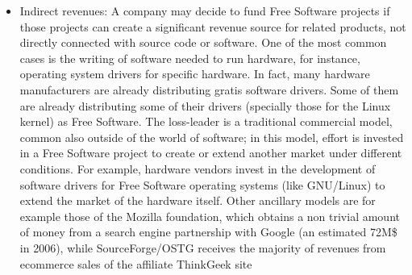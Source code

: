 \begin{itemize}
 \item Indirect revenues: A company may decide to fund Free Software projects if those projects can create a significant revenue source for related products, not directly connected with source code or software. One of the most common cases is the writing of software needed to run hardware, for instance, operating system drivers for specific hardware. In fact, many hardware manufacturers are already distributing gratis software drivers. Some of them are already distributing some of their drivers (specially those for the Linux kernel) as Free Software.  The loss-leader is a traditional commercial model, common also outside of the world of software; in this model, effort is invested in a Free Software project to create or extend another market under different conditions. For example, hardware vendors invest in the development of software drivers for Free Software operating systems (like GNU/Linux) to extend the market of the hardware itself. Other ancillary models are  for example those of the Mozilla foundation, which obtains a non trivial amount of money from a search engine partnership with Google (an estimated 72M\$ in 2006), while SourceForge/OSTG receives the majority of revenues from ecommerce sales of the affiliate ThinkGeek site
\end{itemize}

